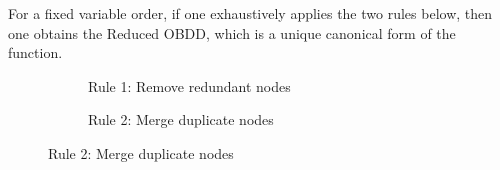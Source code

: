 \documentclass[english, aspectratio=169]{beamer}
\begin{document}
\begin{frame}
  \begin{theorem}[Bryant '86]
    For a fixed variable order, if one exhaustively applies the two rules below,
    then one obtains the Reduced OBDD, which is a unique canonical form of the
    function.    
  \end{theorem}

  \begin{figure}
    \centering
    
    \begin{subfigure}[b]{0.40\linewidth}
      \centering

      \begin{tikzpicture}[scale=0.9, every node/.style={transform shape}]
        
      \end{tikzpicture}
      
      \caption{Rule 1: Remove redundant nodes}
    \end{subfigure}
    \begin{subfigure}[b]{0.59\linewidth}
      \centering

      \begin{tikzpicture}[scale=0.9, every node/.style={transform shape}]
        
      \end{tikzpicture}
      
      \caption{Rule 2: Merge duplicate nodes}
    \end{subfigure}

  \end{figure}
  
\end{frame}

\blankframe
\end{document}

